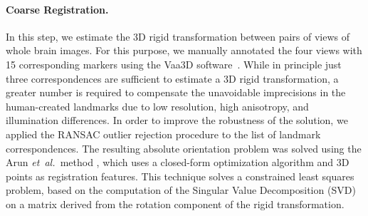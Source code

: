 \documentclass[smallextended]{svjour3}       %
\newcommand{\etal}{\mbox{\emph{et al.\ }}}
\begin{document}
\paragraph{Coarse Registration.}
In this step, we estimate the 3D rigid transformation between pairs of
views of whole brain images. For this purpose, we manually annotated
the four views with 15 corresponding markers using the Vaa3D
software~\cite{peng_v3d_2010}. While in principle just three
correspondences are sufficient to estimate a 3D rigid transformation,
a greater number is required to compensate the unavoidable
imprecisions in the human-created landmarks due to low resolution, high
anisotropy, and illumination differences.
In order to improve the robustness of the solution, we applied the
RANSAC outlier rejection procedure
\cite{fischler_random_1981} to the list of landmark
correspondences. %
%
%
%
The resulting absolute orientation problem was solved using the
Arun \etal method \cite{arun_least-squares_1987}, which uses a closed-form
optimization algorithm and 3D points as registration features. This
technique solves a constrained least squares problem, based on the
computation of the Singular Value Decomposition (SVD) on a matrix
derived from the rotation component of the rigid transformation.
%
\end{document}
